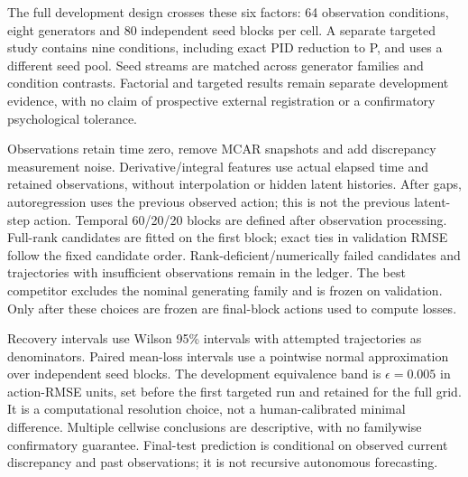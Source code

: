 The full development design crosses these six factors: 64 observation conditions, eight generators and 80 independent seed blocks per cell. A separate targeted study contains nine conditions, including exact PID reduction to P, and uses a different seed pool. Seed streams are matched across generator families and condition contrasts. Factorial and targeted results remain separate development evidence, with no claim of prospective external registration or a confirmatory psychological tolerance.

Observations retain time zero, remove MCAR snapshots and add discrepancy measurement noise. Derivative/integral features use actual elapsed time and retained observations, without interpolation or hidden latent histories. After gaps, autoregression uses the previous observed action; this is not the previous latent-step action. Temporal 60/20/20 blocks are defined after observation processing. Full-rank candidates are fitted on the first block; exact ties in validation RMSE follow the fixed candidate order. Rank-deficient/numerically failed candidates and trajectories with insufficient observations remain in the ledger. The best competitor excludes the nominal generating family and is frozen on validation. Only after these choices are frozen are final-block actions used to compute losses.

Recovery intervals use Wilson 95\% intervals with attempted trajectories as denominators. Paired mean-loss intervals use a pointwise normal approximation over independent seed blocks. The development equivalence band is $\epsilon=0.005$ in action-RMSE units, set before the first targeted run and retained for the full grid. It is a computational resolution choice, not a human-calibrated minimal difference. Multiple cellwise conclusions are descriptive, with no familywise confirmatory guarantee. Final-test prediction is conditional on observed current discrepancy and past observations; it is not recursive autonomous forecasting.
